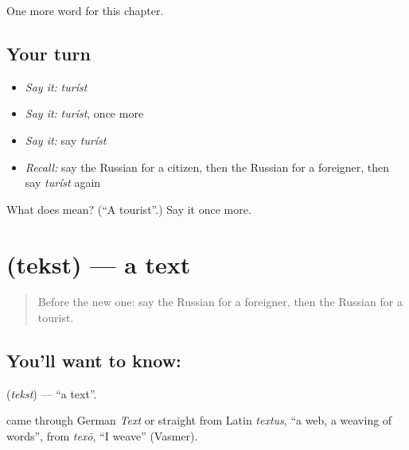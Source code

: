 \begin{grammarlens}[title={What you've built}]
One more word for this chapter.
\end{grammarlens}

\subsection*{Your turn}
\begin{itemize}
\raggedright
  \item \emph{Say it:} \emph{turíst}
  \item \emph{Say it:} \emph{turíst}, once more
  \item \emph{Say it:} say \emph{turíst}
  \item \emph{Recall:} say the Russian for a citizen, then the Russian for a foreigner, then say \emph{turíst} again
\end{itemize}

\begin{tcolorbox}[breakable,colback=teal!4,colframe=teal!35!black,title={Before you move on}]
What does  mean? (\textquotedblleft{}A tourist\textquotedblright{}.) Say it once more.
\end{tcolorbox}
\section[\texorpdfstring{\ru{текст} (tekst)}{текст (tekst)}]{ (tekst) — a text}

\label{lesson:RU-C199-tekst}



\begin{quote}
Before the new one: say the Russian for a foreigner, then the Russian for a tourist.
\end{quote}

\subsection*{You'll want to know: }
\textbf{} (\emph{tekst}) — \textquotedblleft{}a text\textquotedblright{}.

\begin{cousinweb}
\textbf{} came through German \emph{Text} or straight from Latin \emph{textus}, \textquotedblleft{}a web, a weaving of words\textquotedblright{}, from \emph{texō}, \textquotedblleft{}I weave\textquotedblright{} (Vasmer).
\end{cousinweb}

